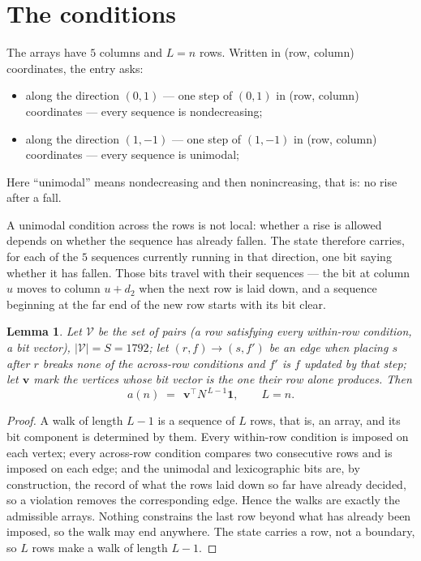 \documentclass[11pt,a4paper]{article}
\theoremstyle{plain}
\newtheorem{lemma}[theorem]{Lemma}
\theoremstyle{definition}
\begin{document}
\section{The conditions}

The arrays have $5$ columns and $L=n$ rows. Written in (row, column)
coordinates, the entry asks:
\begin{itemize}
\item along the direction $(0,1)$ --- one step of $(0,1)$ in (row, column) coordinates --- every sequence is nondecreasing;
\item along the direction $(1,-1)$ --- one step of $(1,-1)$ in (row, column) coordinates --- every sequence is unimodal;
\end{itemize}
Here ``unimodal'' means nondecreasing and then nonincreasing, that is: no rise after a fall.

A unimodal condition across the rows is not local: whether a
rise is allowed depends on whether the sequence has already fallen. The state therefore
carries, for each of the $5$ sequences currently running in that direction, one bit saying
whether it has fallen. Those bits travel with their sequences --- the bit at column $u$
moves to column $u+d_2$ when the next row is laid down, and a sequence beginning at the
far end of the new row starts with its bit clear.

\begin{lemma}\label{lem:walk}
Let $\mathcal V$ be the set of pairs (a row satisfying every within-row condition, a
bit vector), $|\mathcal V|=S=1792$; let $(r,f)\to(s,f')$ be an edge when placing $s$ after $r$
breaks none of the across-row conditions and $f'$ is $f$ updated by that step; let
$\mathbf{v}$ mark the vertices whose bit vector is the one their row alone produces.
Then
\[
a(n)\;=\;\,\mathbf{v}^{\!\top}N^{\,L-1}\mathbf{1},\qquad L=n.
\]
\end{lemma}

\begin{proof}
A walk of length $L-1$ is a sequence of $L$ rows, that is, an array, and its bit component
is determined by them. Every within-row condition is imposed on each vertex; every
across-row condition compares two consecutive rows and is imposed on each edge; and the
unimodal and lexicographic bits are, by construction, the record of what the rows laid down
so far have already decided, so a violation removes the corresponding edge. Hence the walks
are exactly the admissible arrays. Nothing constrains the last row beyond what has already
been imposed, so the walk may end anywhere. The state carries a row, not a boundary, so
$L$ rows make a walk of length $L-1$.
\end{proof}
\end{document}
